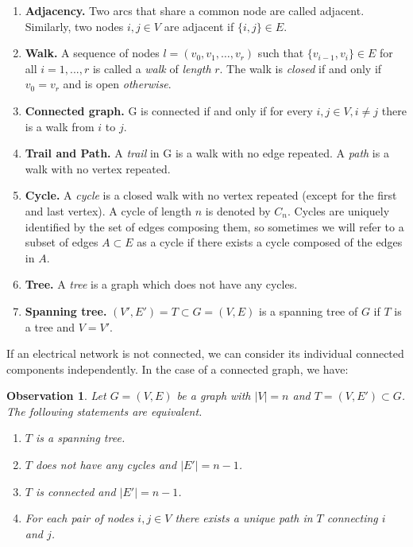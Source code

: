 \documentclass[11pt,a4paper,oneside,openany]{book}
\newtheorem{observation}[theorem]{Observation}
\numberwithin{definition}{section}
\numberwithin{theorem}{section}
\numberwithin{problem}{section}
\begin{document}
\begin{enumerate}
    \item \textbf{Adjacency.} Two arcs that share a common node are called adjacent. Similarly, two nodes \(i, j \in V\) are adjacent if \(\{i, j\}\in E\).
    
    \item \textbf{Walk.} A sequence of nodes \(l = (v_0, v_1, \ldots, v_r)\) such that \(\{v_{i-1},v_i\} \in E\) for all \(i = 1,..., r\) is called a \emph{walk} of \emph{length} \(r\). The walk is \emph{closed} if and only if \(v_0 = v_r\) and is open \emph{otherwise}.
    
    \item \textbf{Connected graph.} G is connected if and only if for every \(i, j \in V, i \neq j\) there is a walk from \(i\) to \(j\).
    
    \item \textbf{Trail and Path.} A \emph{trail} in G is a walk with no edge repeated. A \emph{path} is a walk with no vertex repeated.
    
    \item \textbf{Cycle.} A \emph{cycle} is a closed walk with no vertex repeated (except for the first and last vertex). A cycle of length \(n\) is denoted by \(C_n\). Cycles are uniquely identified by the set of edges composing them, so sometimes we will refer to a subset of edges \(A \subset E\) as a cycle if there exists a cycle composed of the edges in \(A\).

    
    \item \textbf{Tree.} A \emph{tree} is a graph which does not have any cycles. 

    \item \textbf{Spanning tree.} $(V',E') = T \subset G = (V,E)$ is a spanning tree of $G$ if $T$ is a tree and $V = V'$.
\end{enumerate}

If an electrical network is not connected, we can consider its individual connected components independently. In the case of a connected graph, we have: 

\begin{observation}
    Let $G=(V,E)$ be a graph with $|V|=n$ and $T = (V,E') \subset G $. The following statements are equivalent.
    \begin{enumerate}
        \item $T$ is a spanning tree.
        \item $T$ does not have any cycles and $|E'| = n-1$.
        \item $T$ is connected and $|E'| = n-1$.
        \item For each pair of nodes $i,j \in V$ there exists a unique path in $T$ connecting $i$ and $j$.
    \end{enumerate}
\end{observation}
\end{document}

